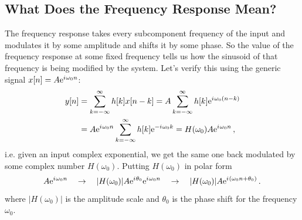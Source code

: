 \subsection{What Does the Frequency Response Mean?}
%
%
The frequency response takes every subcomponent frequency of the input and
modulates it by some amplitude and shifts it by some phase. So the value of the
frequency response at some fixed frequency tells us how the sinusoid of that
frequency is being modified by the system. Let's verify this using the
generic signal $x[n] = A\mathrm{e}^{{i\mkern1mu}\omega_0 n}$:
%
\begin{align*}
  y[n] &= \sum_{k=-\infty}^\infty h[k]x[n-k] = A\sum_{k=-\infty}^\infty h[k]\mathrm{e}^{{i\mkern1mu}\omega_0(n-k)} \\
  &= A\mathrm{e}^{{i\mkern1mu}\omega_0 n}\sum_{k=-\infty}^\infty h[k]\mathrm{e}^{-{i\mkern1mu}\omega_0 k} = H(\omega_0)A\mathrm{e}^{{i\mkern1mu}\omega_0 n} \,,
\end{align*}
%
i.e. given an input complex exponential, we get the same one back modulated by
some complex number $H(\omega_0)$. Putting $H(\omega_0)$ in polar form
%
\begin{displaymath}
  A\mathrm{e}^{{i\mkern1mu}\omega_0 n} \quad\rightarrow\quad
  |H(\omega_0)|A\mathrm{e}^{{i\mkern1mu}\theta_0}\mathrm{e}^{{i\mkern1mu}\omega_0 n} \quad\rightarrow\quad
  |H(\omega_0)|A\mathrm{e}^{{i\mkern1mu}(\omega_0 n + \theta_0)} \,.
\end{displaymath}
%
where $|H(\omega_0)|$ is the amplitude scale and $\theta_0$ is the phase
shift for the frequency $\omega_0$.
%
